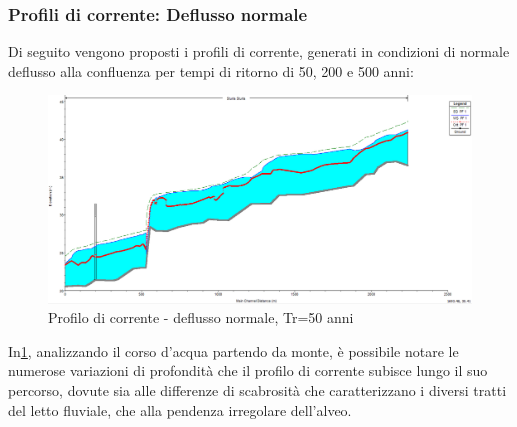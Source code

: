 \documentclass[12pt]{article} %
\begin{document}
\subsubsection{Profili di corrente: Deflusso normale}

\noindent Di seguito vengono proposti i profili di corrente, generati in condizioni di normale deflusso alla confluenza per tempi di ritorno di 50, 200 e 500 anni:
\begin{figure}[H]
    \centering
    \includegraphics[scale=0.5]{ProfU474.PNG}
    \caption{Profilo di corrente - deflusso normale, Tr=50 anni}
    \label{fig:normale_50}
\end{figure}

\noindent In\ref{fig:normale_50}, analizzando il corso d'acqua partendo da monte, è possibile notare le numerose variazioni di profondità che il profilo di corrente subisce lungo il suo percorso, dovute sia alle differenze di scabrosità che caratterizzano i diversi tratti del letto fluviale, che alla pendenza irregolare dell'alveo.
\end{document}

